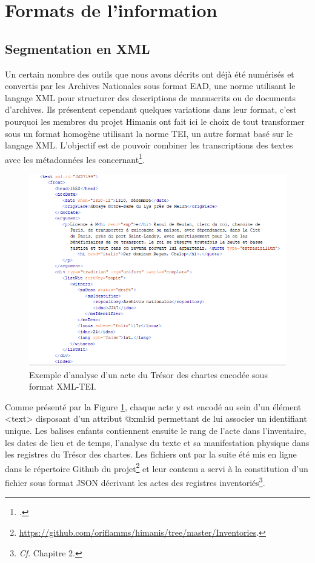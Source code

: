 \documentclass[a4paper,12pt,twoside]{book}
\begin{document}
	\section{Formats de l’information}
	
	\subsection{Segmentation en XML}
	
	Un certain nombre des outils que nous avons décrits ont déjà été numérisés et convertis par les Archives Nationales sous format EAD, une norme utilisant le langage XML pour structurer des descriptions de manuscrits ou de documents d’archives. Ils présentent cependant quelques variations dans leur format, c'est pourquoi les membres du projet Himanis ont fait ici le choix de tout transformer sous un format homogène utilisant la norme TEI, un autre format basé sur le langage XML. L'objectif est de pouvoir combiner les transcriptions des textes avec les métadonnées les concernant\footcite{stutzmann_recherche_2017}.
	
	\begin{figure}
		\centering
		\includegraphics[width=\textwidth]{Images/Inventaire_en_TEI.png}
		\caption{Exemple d'analyse d'un acte du Trésor des chartes encodée sous format XML-TEI.}
		\label{inventaire_TEI}
	\end{figure} 
	
	Comme présenté par la Figure \ref{inventaire_TEI}, chaque acte y est encodé au sein d'un élément <text> disposant d'un attribut @xml:id permettant de lui associer un identifiant unique. Les balises enfants contiennent ensuite le rang de l'acte dans l'inventaire, les dates de lieu et de temps, l'analyse du texte et sa manifestation physique dans les registres du Trésor des chartes. Les fichiers ont par la suite été mis en ligne dans le répertoire Github du projet\footnote{\url{https://github.com/oriflamms/himanis/tree/master/Inventories}.} et leur contenu a servi à la constitution d'un fichier sous format JSON décrivant les actes des registres inventoriés\footnote{\textit{Cf}. Chapitre 2.}.
	
\end{document}

